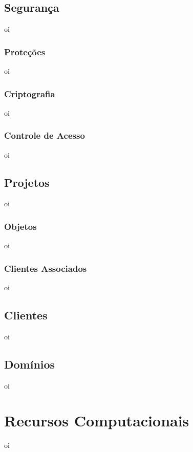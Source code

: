     \subsection{Segurança}
    \label{sec:seguranca}
    oi
        
        \subsubsection{Proteções}
        \label{sec:protecoes}
        oi
        
        \subsubsection{Criptografia}
        \label{sec:criptografia}
        oi
        
        \subsubsection{Controle de Acesso}
        \label{sec:controle-acesso}
        oi
        
    \subsection{Projetos}
    \label{sec:projetos}
    oi
    
        \subsubsection{Objetos}
        \label{sec:objetos}
        oi
        
        \subsubsection{Clientes Associados}
        \label{sec:clientes-associados}
        oi
    \subsection{Clientes}
    \label{sec:clientes}
    oi
    
    \subsection{Domínios}
    \label{sec:dominios}
    oi

\section{Recursos Computacionais}
\label{sec:recursos-computacionais }
oi

